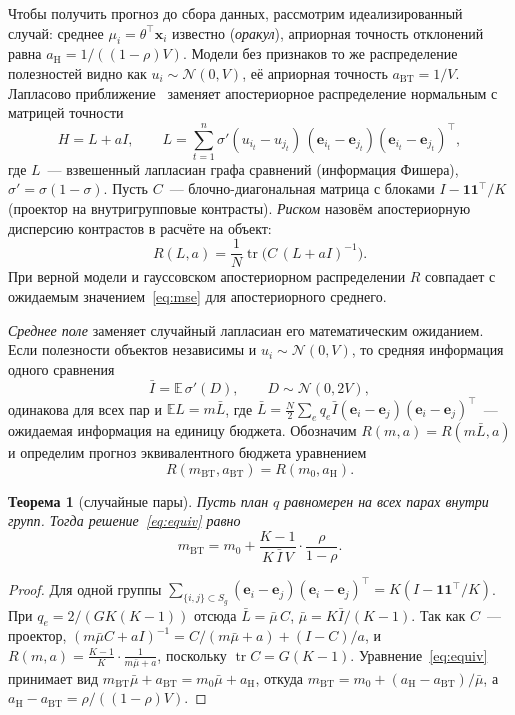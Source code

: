 \documentclass{article}
\newtheorem{theorem}{Теорема}
\theoremstyle{definition}
\theoremstyle{remark}
\newcommand{\E}{\mathbb{E}}
\newcommand{\tr}{\operatorname{tr}}
\newcommand{\bx}{\mathbf{x}}
\newcommand{\be}{\mathbf{e}}
\newcommand{\bone}{\mathbf{1}}
\newcommand{\Lbar}{\bar{L}}
\newcommand{\Ibar}{\bar{I}}
\newcommand{\aBT}{a_{\mathrm{BT}}}
\newcommand{\aH}{a_{\mathrm{H}}}
\newcommand{\mBT}{m_{\mathrm{BT}}}
\begin{document}
Чтобы получить прогноз до сбора данных, рассмотрим идеализированный случай: среднее $\mu_i=\theta^{\top}\bx_i$ известно (\emph{оракул}), априорная точность отклонений равна $\aH=1/((1-\rho)V)$. Модели без признаков то же распределение полезностей видно как $u_i\sim\mathcal N(0,V)$, её априорная точность $\aBT=1/V$. Лапласово приближение~\citep{tierney1986accurate} заменяет апостериорное распределение нормальным с матрицей точности
\begin{equation}\label{eq:precision}
H=L+aI,\qquad L=\sum_{t=1}^{n}\sigma'(u_{i_t}-u_{j_t})\,(\be_{i_t}-\be_{j_t})(\be_{i_t}-\be_{j_t})^{\top},
\end{equation}
где $L$~--- взвешенный лапласиан графа сравнений (информация Фишера), $\sigma'=\sigma(1-\sigma)$. Пусть $C$~--- блочно-диагональная матрица с блоками $I-\bone\bone^{\top}/K$ (проектор на внутригрупповые контрасты). \emph{Риском} назовём апостериорную дисперсию контрастов в расчёте на объект:
\begin{equation}\label{eq:risk}
R(L,a)=\frac1N\tr\bigl(C\,(L+aI)^{-1}\bigr).
\end{equation}
При верной модели и гауссовском апостериорном распределении $R$ совпадает с ожидаемым значением~\eqref{eq:mse} для апостериорного среднего.

\emph{Среднее поле} заменяет случайный лапласиан его математическим ожиданием. Если полезности объектов независимы и $u_i\sim\mathcal N(0,V)$, то средняя информация одного сравнения
\begin{equation}\label{eq:ibar}
\Ibar=\E\,\sigma'(D),\qquad D\sim\mathcal N(0,2V),
\end{equation}
одинакова для всех пар и $\E L=m\Lbar$, где $\Lbar=\frac N2\sum_e q_e\Ibar(\be_i-\be_j)(\be_i-\be_j)^{\top}$~--- ожидаемая информация на единицу бюджета. Обозначим $R(m,a)=R(m\Lbar,a)$ и определим прогноз эквивалентного бюджета уравнением
\begin{equation}\label{eq:equiv}
R(\mBT,\aBT)=R(m_0,\aH).
\end{equation}

\begin{theorem}[случайные пары]\label{thm:closed}
Пусть план $q$ равномерен на всех парах внутри групп. Тогда решение~\eqref{eq:equiv} равно
\begin{equation}\label{eq:closed}
\mBT=m_0+\frac{K-1}{K\,\Ibar\,V}\cdot\frac{\rho}{1-\rho}.
\end{equation}
\end{theorem}
\begin{proof}
Для одной группы $\sum_{\{i,j\}\subset S_g}(\be_i-\be_j)(\be_i-\be_j)^{\top}=K(I-\bone\bone^{\top}/K)$. При $q_e=2/(GK(K-1))$ отсюда $\Lbar=\bar\mu\,C$, $\bar\mu=K\Ibar/(K-1)$. Так как $C$~--- проектор, $(m\bar\mu C+aI)^{-1}=C/(m\bar\mu+a)+(I-C)/a$, и $R(m,a)=\frac{K-1}{K}\cdot\frac{1}{m\bar\mu+a}$, поскольку $\tr C=G(K-1)$. Уравнение~\eqref{eq:equiv} принимает вид $\mBT\bar\mu+\aBT=m_0\bar\mu+\aH$, откуда $\mBT=m_0+(\aH-\aBT)/\bar\mu$, а $\aH-\aBT=\rho/((1-\rho)V)$.
\end{proof}
\end{document}

